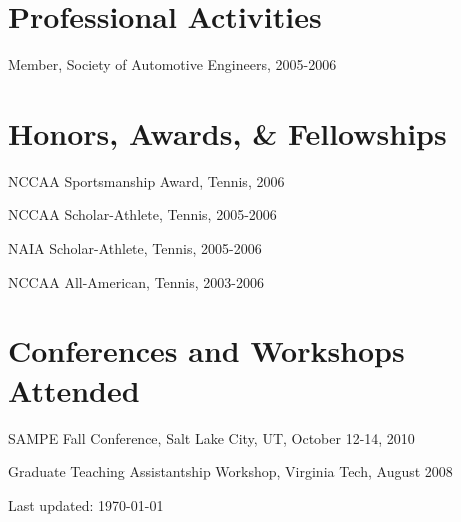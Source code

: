 \documentclass[10pt,letterpaper]{article}
\renewenvironment{itemize}{
  \begin{list}{}{
    \setlength{\leftmargin}{1.5em}
    \setlength{\itemsep}{0.25em}
    \setlength{\parskip}{0pt}
    \setlength{\parsep}{0.25em}
  }
}{
  \end{list}
}
\begin{document}
%
%

\section*{Professional Activities}
\begin{itemize}
\item Member, Society of Automotive Engineers, 2005-2006
\end{itemize}

\section*{Honors, Awards, \& Fellowships}

\begin{itemize}
\item NCCAA Sportsmanship Award, Tennis, 2006
\item NCCAA Scholar-Athlete, Tennis, 2005-2006
\item NAIA Scholar-Athlete, Tennis, 2005-2006
\item NCCAA All-American, Tennis, 2003-2006
\end{itemize}

\section*{Conferences and Workshops Attended}

\begin{itemize}
\item SAMPE Fall Conference, Salt Lake City, UT, October 12-14, 2010
\item Graduate Teaching Assistantship Workshop, Virginia Tech, August 2008
\end{itemize}

\medskip

\begin{center}
  \begin{small}
    Last updated: \today
  \end{small}
\end{center}
\end{document}
